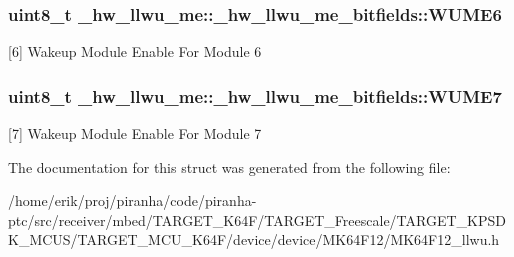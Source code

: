 \subsubsection[{\texorpdfstring{W\+U\+M\+E6}{WUME6}}]{\setlength{\rightskip}{0pt plus 5cm}uint8\+\_\+t \+\_\+hw\+\_\+llwu\+\_\+me\+::\+\_\+hw\+\_\+llwu\+\_\+me\+\_\+bitfields\+::\+W\+U\+M\+E6}\hypertarget{struct__hw__llwu__me_1_1__hw__llwu__me__bitfields_a476931b76842b0d4d226ce94b72e1524}{}\label{struct__hw__llwu__me_1_1__hw__llwu__me__bitfields_a476931b76842b0d4d226ce94b72e1524}
\mbox{[}6\mbox{]} Wakeup Module Enable For Module 6 
\subsubsection[{\texorpdfstring{W\+U\+M\+E7}{WUME7}}]{\setlength{\rightskip}{0pt plus 5cm}uint8\+\_\+t \+\_\+hw\+\_\+llwu\+\_\+me\+::\+\_\+hw\+\_\+llwu\+\_\+me\+\_\+bitfields\+::\+W\+U\+M\+E7}\hypertarget{struct__hw__llwu__me_1_1__hw__llwu__me__bitfields_ac7dfa0e8f68b07c40fefb0c6a0147db0}{}\label{struct__hw__llwu__me_1_1__hw__llwu__me__bitfields_ac7dfa0e8f68b07c40fefb0c6a0147db0}
\mbox{[}7\mbox{]} Wakeup Module Enable For Module 7 

The documentation for this struct was generated from the following file\+:\begin{DoxyCompactItemize}
\item 
/home/erik/proj/piranha/code/piranha-\/ptc/src/receiver/mbed/\+T\+A\+R\+G\+E\+T\+\_\+\+K64\+F/\+T\+A\+R\+G\+E\+T\+\_\+\+Freescale/\+T\+A\+R\+G\+E\+T\+\_\+\+K\+P\+S\+D\+K\+\_\+\+M\+C\+U\+S/\+T\+A\+R\+G\+E\+T\+\_\+\+M\+C\+U\+\_\+\+K64\+F/device/device/\+M\+K64\+F12/M\+K64\+F12\+\_\+llwu.\+h\end{DoxyCompactItemize}
